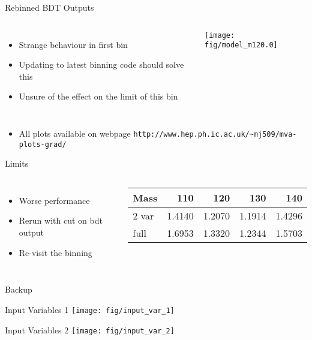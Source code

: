 \documentclass[t, 8pt]{beamer}
\begin{document}
\begin{frame}[fragile]{Rebinned BDT Outputs}
  \begin{columns}[c]
  \begin{itemize}
    \item Strange behaviour in first bin
    \item Updating to latest binning code should solve this
    \item Unsure of the effect on the limit of this bin
  \end{itemize}
    \texttt{[image: fig/model\_m120.0]}
  \end{columns}
  \begin{itemize}
    \item All plots available on webpage
    \tiny{\verb=http://www.hep.ph.ic.ac.uk/~mj509/mva-plots-grad/=}
  \end{itemize}
\end{frame}

\begin{frame}{Limits}
  \vspace{1cm}
  \begin{columns}[c]
  \begin{itemize}
    \item Worse performance
    \item Rerun with cut on bdt output
    \item Re-visit the binning
  \end{itemize}
\begin{center}

\begin{table}[htbp]
\begin{tabular}{|l|r r r r |}
\hline

Mass & 110 & 120 & 130 & 140 \\ \hline
2 var & 1.4140 & 1.2070 & 1.1914 & 1.4296 \\
full  & 1.6953 & 1.3320 & 1.2344 & 1.5703  \\ \hline

\end{tabular}
\end{table}
\end{center}
\end{columns}
\end{frame}


\begin{frame}{Backup}
\end{frame}

\begin{frame}{Input Variables 1}
    \texttt{[image: fig/input\_var\_1]}
\end{frame}

\begin{frame}{Input Variables 2}
    \texttt{[image: fig/input\_var\_2]}
\end{frame}
\end{document}
